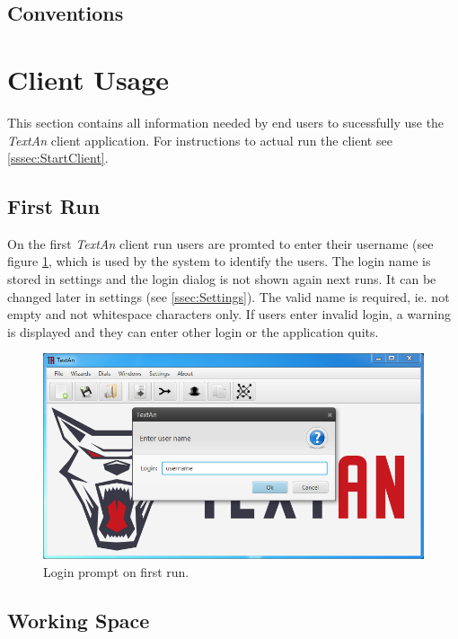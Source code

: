 \documentclass[12pt,a4paper]{report}
\newcommand{\textan}{\emph{TextAn}}
\begin{document}
\subsection{Conventions}

\section{Client Usage}

This section contains all information needed by end users to sucessfully use
the \textan{} client application. For instructions to actual run the client
see \ref{sssec:StartClient}.

\subsection{First Run}

On the first \textan{} client run users are promted to enter their username
(see figure \ref{fig:Login}, which is used by the system to identify the users.
The login name is stored in settings and the login dialog is not shown again
next runs. It can be changed later in settings (see \ref{ssec:Settings}). The
valid name is required, ie. not empty and not whitespace characters only. If
users enter invalid login, a warning is displayed and they can enter other
login or the application quits.

\begin{figure}[!htb]
        \centering
        \includegraphics[width=\textwidth]{Images/login}
        \caption{Login prompt on first run.}
        \label{fig:Login}
\end{figure}

\subsection{Working Space}
\end{document}
